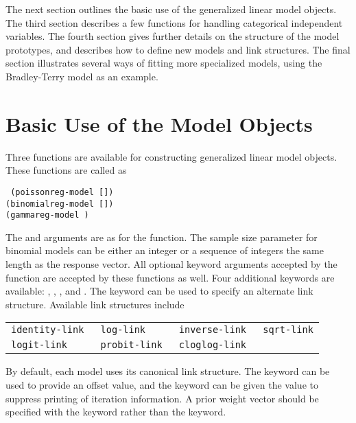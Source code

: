 The next section outlines the basic use of the generalized linear
model objects. The third section describes a few functions for
handling categorical independent variables. The fourth section gives
further details on the structure of the model prototypes, and
describes how to define new models and link structures. The final
section illustrates several ways of fitting more specialized models,
using the Bradley-Terry model as an example.

\section{Basic Use of the Model Objects}
Three functions are available for constructing generalized linear
model objects.  These functions are called as
\begin{flushleft}\tt
(poissonreg-model   [])\\
(binomialreg-model    [])\\
(gammareg-model   )
\end{flushleft}
The  and  arguments are as for the
 function. The sample size parameter 
for binomial models can be either an integer or a sequence of integers
the same length as the response vector. All optional keyword
arguments accepted by the  function are
accepted by these functions as well. Four additional keywords are
available:
, , , and .
The keyword  can be used to specify an alternate link
structure. Available link structures include
\begin{center}
\begin{tabular}{llll}
\tt identity-link & \tt log-link    & \tt inverse-link & \tt sqrt-link\\
\tt logit-link    & \tt probit-link & \tt cloglog-link
\end{tabular}
\end{center}
By default, each model uses its canonical link structure.  The
 keyword can be used to provide an offset value, and
the keyword  can be given the value  to
suppress printing of iteration information. A prior weight vector
should be specified with the  keyword rather than the
 keyword.

